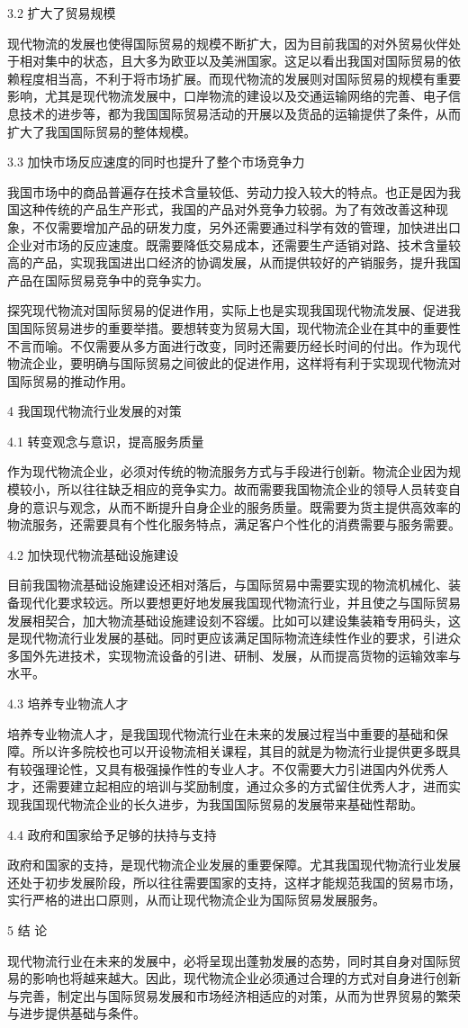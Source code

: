 3.2 扩大了贸易规模

现代物流的发展也使得国际贸易的规模不断扩大，因为目前我国的对外贸易伙伴处于相对集中的状态，且大多为欧亚以及美洲国家。这足以看出我国对国际贸易的依赖程度相当高，不利于将市场扩展。而现代物流的发展则对国际贸易的规模有重要影响，尤其是现代物流发展中，口岸物流的建设以及交通运输网络的完善、电子信息技术的进步等，都为我国国际贸易活动的开展以及货品的运输提供了条件，从而扩大了我国国际贸易的整体规模。

3.3 加快市场反应速度的同时也提升了整个市场竞争力

我国市场中的商品普遍存在技术含量较低、劳动力投入较大的特点。也正是因为我国这种传统的产品生产形式，我国的产品对外竞争力较弱。为了有效改善这种现象，不仅需要增加产品的研发力度，另外还需要通过科学有效的管理，加快进出口企业对市场的反应速度。既需要降低交易成本，还需要生产适销对路、技术含量较高的产品，实现我国进出口经济的协调发展，从而提供较好的产销服务，提升我国产品在国际贸易竞争中的竞争实力。

探究现代物流对国际贸易的促进作用，实际上也是实现我国现代物流发展、促进我国国际贸易进步的重要举措。要想转变为贸易大国，现代物流企业在其中的重要性不言而喻。不仅需要从多方面进行改变，同时还需要历经长时间的付出。作为现代物流企业，要明确与国际贸易之间彼此的促进作用，这样将有利于实现现代物流对国际贸易的推动作用。

4 我国现代物流行业发展的对策

4.1 转变观念与意识，提高服务质量

作为现代物流企业，必须对传统的物流服务方式与手段进行创新。物流企业因为规模较小，所以往往缺乏相应的竞争实力。故而需要我国物流企业的领导人员转变自身的意识与观念，从而不断提升自身企业的服务质量。既需要为货主提供高效率的物流服务，还需要具有个性化服务特点，满足客户个性化的消费需要与服务需要。

4.2 加快现代物流基础设施建设

目前我国物流基础设施建设还相对落后，与国际贸易中需要实现的物流机械化、装备现代化要求较远。所以要想更好地发展我国现代物流行业，并且使之与国际贸易发展相契合，加大物流基础设施建设刻不容缓。比如可以建设集装箱专用码头，这是现代物流行业发展的基础。同时更应该满足国际物流连续性作业的要求，引进众多国外先进技术，实现物流设备的引进、研制、发展，从而提高货物的运输效率与水平。

4.3 培养专业物流人才

培养专业物流人才，是我国现代物流行业在未来的发展过程当中重要的基础和保障。所以许多院校也可以开设物流相关课程，其目的就是为物流行业提供更多既具有较强理论性，又具有极强操作性的专业人才。不仅需要大力引进国内外优秀人才，还需要建立起相应的培训与奖励制度，通过众多的方式留住优秀人才，进而实现我国现代物流企业的长久进步，为我国国际贸易的发展带来基础性帮助。

4.4 政府和国家给予足够的扶持与支持

政府和国家的支持，是现代物流企业发展的重要保障。尤其我国现代物流行业发展还处于初步发展阶段，所以往往需要国家的支持，这样才能规范我国的贸易市场，实行严格的进出口原则，从而让现代物流企业为国际贸易发展服务。

5 结 论

现代物流行业在未来的发展中，必将呈现出蓬勃发展的态势，同时其自身对国际贸易的影响也将越来越大。因此，现代物流企业必须通过合理的方式对自身进行创新与完善，制定出与国际贸易发展和市场经济相适应的对策，从而为世界贸易的繁荣与进步提供基础与条件。